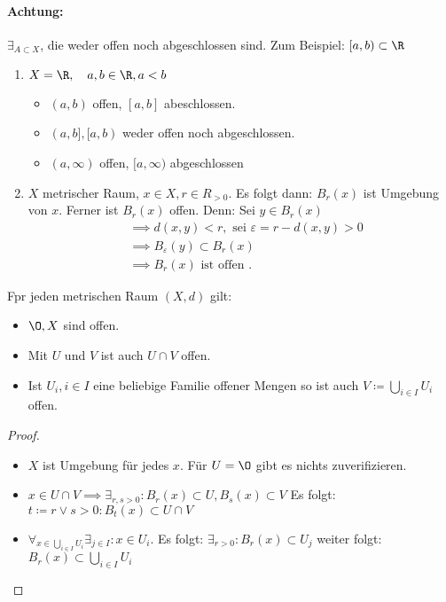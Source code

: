 \paragraph{Achtung: } $\exists_{A \subset X}$, die weder offen noch abgeschlossen sind. Zum Beispiel: $[a,b) \subset \R$
\begin{example}
\begin{enumerate}
    \item $X= \R, \quad a,b \in \R, a<b$ 
        \begin{itemize}
            \item $(a,b)$ offen, $[a,b]$ abeschlossen. 
            \item $(a,b], [a,b)$ weder offen noch abgeschlossen.
            \item $(a,\infty)$ offen, $[a,\infty)$ abgeschlossen 
        \end{itemize}
    \item $X$ metrischer Raum, $x \in X, r \in R_{>0}$. Es folgt dann: $B_r(x)$ ist Umgebung von $x$. Ferner ist $B_r(x)$ offen. Denn: Sei $y \in B_r(x)$
        \begin{align*}
            &\implies d(x,y) < r, \text{ sei  } \varepsilon = r-d(x,y) >0 \\
            &\implies B_{\varepsilon}(y) \subset B_r(x) \\
            &\implies B_r(x) \text{ ist offen }
        .\end{align*}
\end{enumerate}
\end{example}
\begin{theorem}
Fpr jeden metrischen Raum $(X,d)$ gilt: 
\begin{itemize}
    \item $\O, X$ sind offen.
    \item Mit $U$ und $V$ ist auch $U \cap V$ offen.
    \item Ist $U_i, i \in I$ eine beliebige Familie offener Mengen so ist auch $V \coloneqq \bigcup_{i \in I} U_i$ offen.
\end{itemize}
\end{theorem}
\begin{proof}
\begin{itemize}
    \item $X$ ist Umgebung für jedes $x$. Für $U= \O$ gibt es nichts zuverifizieren. 
    \item $x \in U \cap V \implies \exists_{r,s >0 }: B_r(x) \subset U, B_s(x) \subset V$ Es folgt:
        $t \coloneqq r \vee s >0 : B_t(x) \subset U \cap V$
    \item $\forall_{x \in \bigcup_{i \in I} U_i} \exists_{j \in I} : x \in U_i$. Es folgt: $ \exists_{r>0}: B_r(x) \subset U_j$ weiter folgt: $B_r(x) \subset \bigcup_{i \in I} U_i$   
\end{itemize}
\end{proof}
